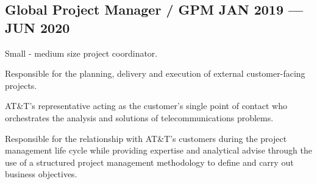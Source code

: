 \documentclass[letter,10pt]{article}
\begin{document}
\subsection{{Global Project Manager / GPM \hfill JAN 2019 --- JUN 2020}}
\newline
{}
\begin{zitemize}
\item Small - medium size project coordinator.
\item Responsible for the planning, delivery and execution of external customer-facing projects.
\item AT&T’s representative acting as the customer’s single point of contact who orchestrates the analysis and solutions of telecommunications problems.
\item Responsible for the relationship with AT&T’s customers during the project management life cycle while providing expertise and analytical advise through the use of a structured project management methodology to define and carry out business objectives.
\newline
\end{zitemize}

\end{document}

